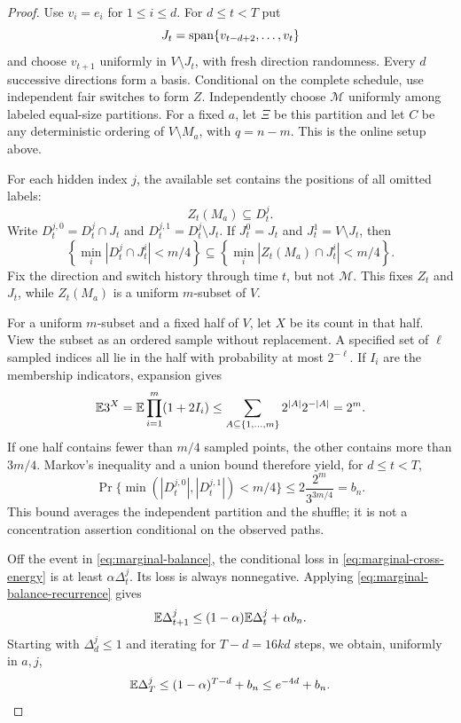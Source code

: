 \begin{proof}
Use $v_i=e_i$ for $1\le i\le d$. For $d\le t<T$ put
\begin{equation}\label{eq:marginal-hyperplane}
 J_t=\operatorname{span}\{v_{t-d+2},\ldots,v_t\}
\end{equation}
and choose $v_{t+1}$ uniformly in $V\setminus J_t$, with fresh
direction randomness. Every $d$ successive directions form a
basis. Conditional on the complete schedule, use independent fair
switches to form $Z$. Independently choose $\mathcal M$ uniformly
among labeled equal-size partitions. For a fixed $a$, let $\Xi$
be this partition and let $C$ be any deterministic ordering of
$V\setminus M_a$, with $q=n-m$. This is the online setup above.

For each hidden index $j$, the available set contains the positions
of all omitted labels:
\begin{equation}\label{eq:marginal-permanent-holes}
 Z_t(M_a)\subseteq D_t^j.
\end{equation}
Write $D_t^{j,0}=D_t^j\cap J_t$ and
$D_t^{j,1}=D_t^j\setminus J_t$. If
$J_t^0=J_t$ and $J_t^1=V\setminus J_t$, then
\[
 \left\{\min_i|D_t^j\cap J_t^i|<m/4\right\}
 \subseteq
 \left\{\min_i|Z_t(M_a)\cap J_t^i|<m/4\right\}.
\]
Fix the direction and switch history through time $t$, but not
$\mathcal M$. This fixes $Z_t$ and $J_t$, while $Z_t(M_a)$ is a
uniform $m$-subset of $V$.

For a uniform $m$-subset and a fixed half of $V$, let $X$ be its
count in that half. View the subset as an ordered sample without
replacement. A specified set of $\ell$ sampled indices all lie
in the half with probability at most $2^{-\ell}$. If $I_i$ are
the membership indicators, expansion gives
\[
 \mathbb E3^X=\mathbb E\prod_{i=1}^m(1+2I_i)
 \le\sum_{A\subseteq\{1,\ldots,m\}}2^{|A|}2^{-|A|}=2^m.
\]
If one half contains fewer than $m/4$ sampled points, the other
contains more than $3m/4$. Markov's inequality and a union bound
therefore yield, for $d\le t<T$,
\begin{equation}\label{eq:marginal-balance}
 \Pr\{\min(|D_t^{j,0}|,|D_t^{j,1}|)<m/4\}
 \le2\frac{2^m}{3^{3m/4}}=b_n.
\end{equation}
This bound averages the independent partition and the shuffle; it
is not a concentration assertion conditional on the observed paths.

Off the event in \eqref{eq:marginal-balance}, the conditional loss
in \eqref{eq:marginal-cross-energy} is at least
$\alpha\Delta_t^j$. Its loss is always nonnegative. Applying
\eqref{eq:marginal-balance-recurrence} gives
\begin{equation}\label{eq:marginal-recursion}
 \mathbb E\Delta_{t+1}^j
 \le(1-\alpha)\mathbb E\Delta_t^j+\alpha b_n.
\end{equation}
Starting with $\Delta_d^j\le1$ and iterating for $T-d=16kd$
steps, we obtain, uniformly in $a,j$,
\begin{equation}\label{eq:marginal-terminal-energy}
 \mathbb E\Delta_T^j\le(1-\alpha)^{T-d}+b_n
 \le e^{-4d}+b_n.
\end{equation}


\end{proof}
